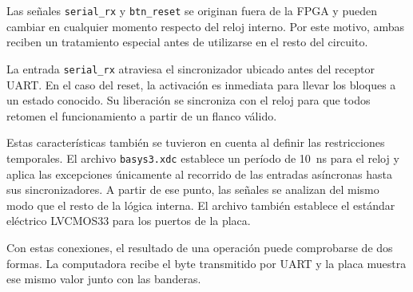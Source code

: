 Las señales \texttt{serial\_rx} y \texttt{btn\_reset} se originan
fuera de la FPGA y pueden cambiar en cualquier momento respecto del
reloj interno. Por este motivo, ambas reciben un tratamiento especial
antes de utilizarse en el resto del circuito.

La entrada \texttt{serial\_rx} atraviesa el sincronizador ubicado
antes del receptor UART. En el caso del reset, la activación es
inmediata para llevar los bloques a un estado conocido. Su liberación
se sincroniza con el reloj para que todos retomen el funcionamiento a
partir de un flanco válido.

Estas características también se tuvieron en cuenta al definir las
restricciones temporales. El archivo \texttt{basys3.xdc} establece un
período de \SI{10}{\nano\second} para el reloj y aplica las
excepciones únicamente al recorrido de las entradas asíncronas hasta
sus sincronizadores. A partir de ese punto, las señales se analizan
del mismo modo que el resto de la lógica interna. El archivo también
establece el estándar eléctrico LVCMOS33 para los puertos de la placa.

Con estas conexiones, el resultado de una operación puede comprobarse
de dos formas. La computadora recibe el byte transmitido por UART y
la placa muestra ese mismo valor junto con las banderas.
